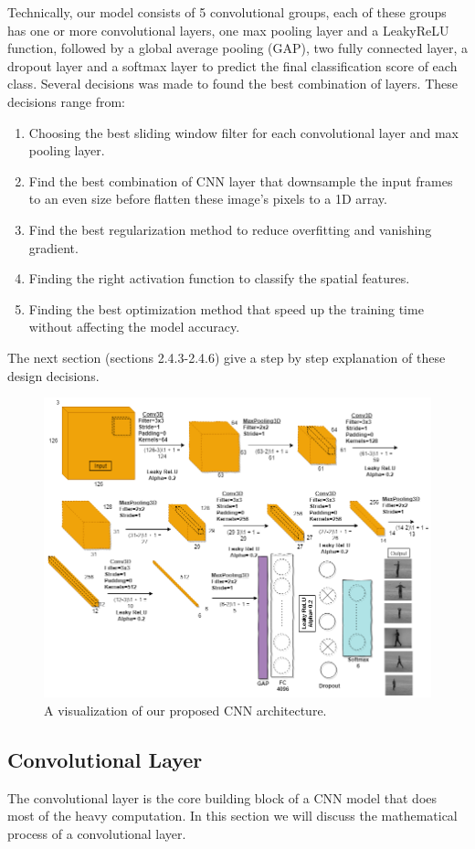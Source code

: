 Technically, our model consists of 5 convolutional groups, each of these groups has one or more convolutional layers, one max pooling layer and a LeakyReLU function, followed by a global average pooling (GAP), two fully connected layer, a dropout  layer and a  softmax layer to predict the final classification score of each class. Several decisions was made to found the best combination of layers. These decisions range from:
\begin{enumerate}
    \item Choosing the best sliding window filter for each convolutional layer and max pooling layer.
    \item Find the best combination of CNN layer that downsample the input frames to an even size before flatten these image's pixels to a 1D array.
    \item Find the best regularization method to reduce overfitting and vanishing gradient.
    \item Finding the right activation function to classify the spatial features.
    \item Finding the best optimization method that speed up the training time without affecting the model accuracy.
\end{enumerate}
The next section (sections 2.4.3-2.4.6) give a step by step explanation of these design decisions.
\begin{figure}[ht]
\centering
\includegraphics[width=0.85\columnwidth]{Figures/nn2.png}
\decoRule
\caption[A visualization of our proposed CNN architecture.]{A visualization of our proposed CNN architecture.}
\label{fig:la2}
\end{figure}

\subsection{Convolutional Layer}
\hspace{5mm} The convolutional layer is the core building block of a CNN model that does most of the heavy computation. In this section we will discuss the mathematical process of a convolutional layer.\\

